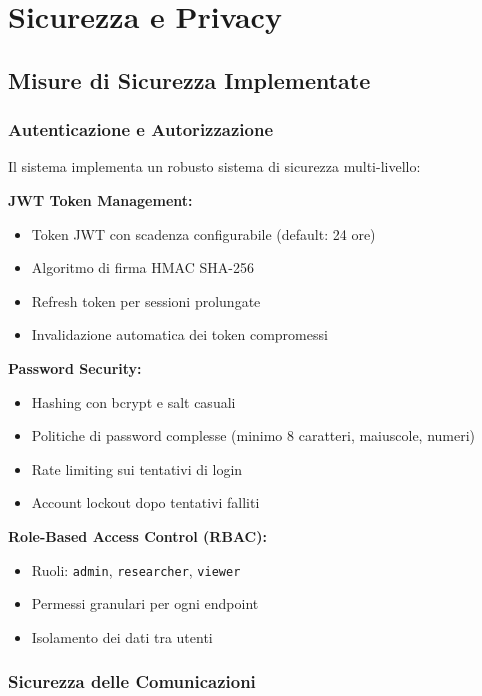 \documentclass[12pt,a4paper]{report}
\begin{document}
\chapter{Sicurezza e Privacy}

\section{Misure di Sicurezza Implementate}

\subsection{Autenticazione e Autorizzazione}

Il sistema implementa un robusto sistema di sicurezza multi-livello:

\textbf{JWT Token Management:}
\begin{itemize}
    \item Token JWT con scadenza configurabile (default: 24 ore)
    \item Algoritmo di firma HMAC SHA-256
    \item Refresh token per sessioni prolungate
    \item Invalidazione automatica dei token compromessi
\end{itemize}

\textbf{Password Security:}
\begin{itemize}
    \item Hashing con bcrypt e salt casuali
    \item Politiche di password complesse (minimo 8 caratteri, maiuscole, numeri)
    \item Rate limiting sui tentativi di login
    \item Account lockout dopo tentativi falliti
\end{itemize}

\textbf{Role-Based Access Control (RBAC):}
\begin{itemize}
    \item Ruoli: \texttt{admin}, \texttt{researcher}, \texttt{viewer}
    \item Permessi granulari per ogni endpoint
    \item Isolamento dei dati tra utenti
\end{itemize}

\subsection{Sicurezza delle Comunicazioni}
\end{document}
